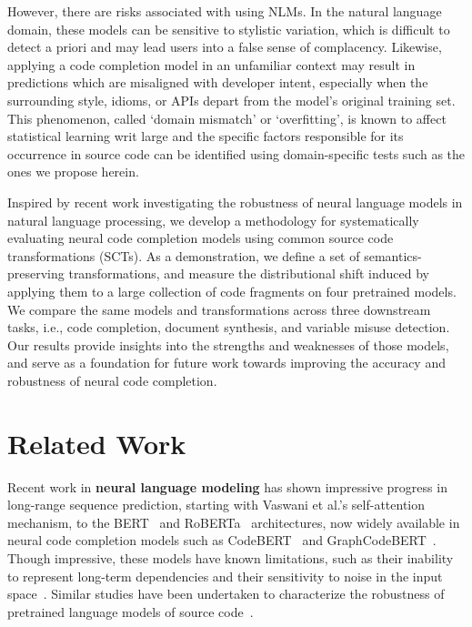 \documentclass[usenames,dvipsnames]{article} %
\begin{document}
  However, there are risks associated with using NLMs. In the natural language domain, these models can be sensitive to stylistic variation, which is difficult to detect a priori and may lead users into a false sense of complacency. Likewise, applying a code completion model in an unfamiliar context may result in predictions which are misaligned with developer intent, especially when the surrounding style, idioms, or APIs depart from the model's original training set. This phenomenon, called `domain mismatch' or `overfitting', is known to affect statistical learning writ large and the specific factors responsible for its occurrence in source code can be identified using domain-specific tests such as the ones we propose herein.

  Inspired by recent work investigating the robustness of neural language models in natural language processing, we develop a methodology for systematically evaluating neural code completion models using common source code transformations (SCTs). As a demonstration, we define a set of semantics-preserving transformations, and measure the distributional shift induced by applying them to a large collection of code fragments on four pretrained models. We compare the same models and transformations across three downstream tasks, i.e., code completion, document synthesis, and variable misuse detection. Our results provide insights into the strengths and weaknesses of those models, and serve as a foundation for future work towards improving the accuracy and robustness of neural code completion.

  \section{Related Work}\label{sec:related_work}

  Recent work in \textbf{neural language modeling} has shown impressive progress in long-range sequence prediction, starting with Vaswani et al.'s self-attention~\citep{vaswani2017attention} mechanism, to the BERT~\citep{devlin2018bert} and RoBERTa~\citep{liu2019roberta} architectures, now widely available in neural code completion models such as CodeBERT~\citep{feng2020codebert} and GraphCodeBERT~\citep{guo2021graphcodebert}. Though impressive, these models have known limitations, such as their inability to represent long-term dependencies and their sensitivity to noise in the input space~\cite{sun2020adv}. Similar studies have been undertaken to characterize the robustness of pretrained language models of source code~\citep{hellendoorn2017deep}.
\end{document}
